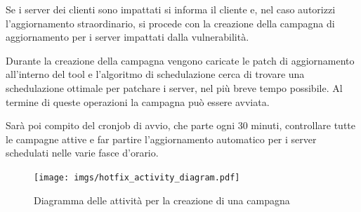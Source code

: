 Se i server dei clienti sono impattati si informa il cliente e, nel caso autorizzi 
l’aggiornamento straordinario, si procede con la creazione della campagna di 
aggiornamento per i server impattati dalla vulnerabilità.

Durante la creazione della campagna vengono caricate le patch di aggiornamento 
all’interno del tool e l’algoritmo di schedulazione cerca di trovare una 
schedulazione ottimale per patchare i server, nel più breve tempo possibile. 
Al termine di queste operazioni la campagna può essere avviata.

Sarà poi compito del cronjob di avvio, che parte ogni 30 minuti, controllare 
tutte le campagne attive e far partire l'aggiornamento automatico per i server 
schedulati nelle varie fasce d'orario.

\begin{figure}[H]
  \begin{flushright}
    \centering
    \texttt{[image: imgs/hotfix\_activity\_diagram.pdf]}
    \caption{Diagramma delle attività per la creazione di una campagna}
    \label{fig:Diagramma delle attività per la creazione di una campagna}
  \end{flushright}
\end{figure}
